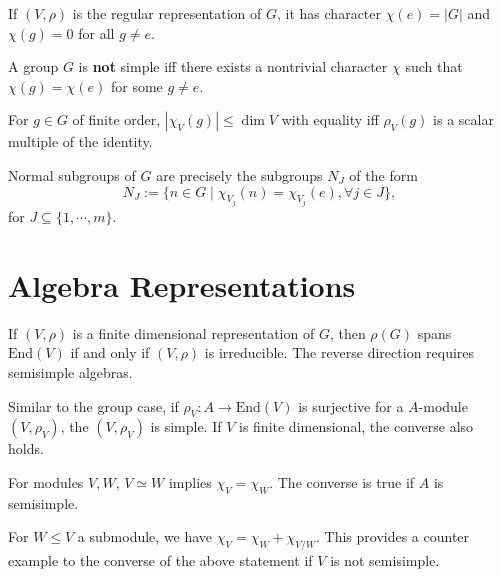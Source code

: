 \documentclass[]{article}
\theoremstyle{definition}
\begin{document}
If \((V, \rho)\) is the regular representation of \(G\), it has character \(\chi(e) = |G|\) and 
\(\chi(g) = 0\) for all \(g \neq e\).

A group \(G\) is \textbf{not} simple iff there exists a nontrivial character \(\chi\) such that 
\(\chi(g) = \chi(e)\) for some \(g \neq e\).

For \(g \in G\) of finite order, \(|\chi_V(g)| \le \dim V\) with equality iff 
\(\rho_V(g)\) is a scalar multiple of the identity.

Normal subgroups of \(G\) are precisely the subgroups \(N_J\) of the form
\[N_J := \{n \in G \mid \chi_{V_j}(n) = \chi_{V_j}(e), \forall j \in J\},\]
for \(J \subseteq \{1, \cdots, m\}\).

\section*{Algebra Representations}

If \((V, \rho)\) is a finite dimensional representation of \(G\), then \(\rho(G)\) spans 
\(\text{End}(V)\) if and only if \((V, \rho)\) is irreducible. The reverse direction 
requires semisimple algebras.

Similar to the group case, if \(\rho_V : A \to \text{End}(V)\) is surjective 
for a \(A\)-module \((V, \rho_V)\), the \((V, \rho_V)\) is simple. If \(V\) is 
finite dimensional, the converse also holds.

For modules \(V, W\), \(V \simeq W\) implies \(\chi_V = \chi_W\). The converse is 
true if \(A\) is semisimple.

For \(W \le V\) a submodule, we have \(\chi_V = \chi_W + \chi_{V / W}\). This provides 
a counter example to the converse of the above statement if \(V\) is not semisimple. 
\end{document}
